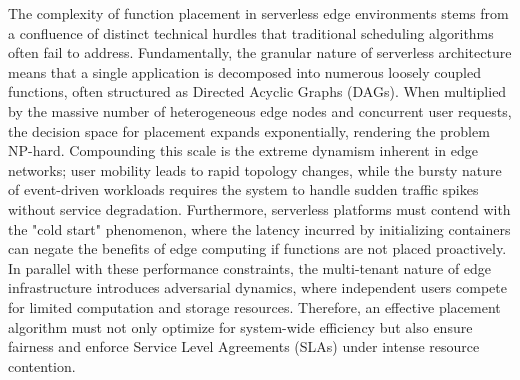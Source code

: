 \documentclass[lettersize,journal]{IEEEtran}
\begin{document}
The complexity of function placement in serverless edge environments stems from a confluence of distinct technical hurdles that traditional scheduling algorithms often fail to address. Fundamentally, the granular nature of serverless architecture means that a single application is decomposed into numerous loosely coupled functions, often structured as Directed Acyclic Graphs (DAGs). When multiplied by the massive number of heterogeneous edge nodes and concurrent user requests, the decision space for placement expands exponentially, rendering the problem NP-hard. Compounding this scale is the extreme dynamism inherent in edge networks; user mobility leads to rapid topology changes, while the bursty nature of event-driven workloads requires the system to handle sudden traffic spikes without service degradation. Furthermore, serverless platforms must contend with the "cold start" phenomenon, where the latency incurred by initializing containers can negate the benefits of edge computing if functions are not placed proactively. In parallel with these performance constraints, the multi-tenant nature of edge infrastructure introduces adversarial dynamics, where independent users compete for limited computation and storage resources. Therefore, an effective placement algorithm must not only optimize for system-wide efficiency but also ensure fairness and enforce Service Level Agreements (SLAs) under intense resource contention.
\end{document}
